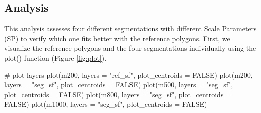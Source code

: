 \subsection{Analysis}

This analysis assesses four different segmentations with different Scale Parameters (SP) to verify which one fits better with the reference polygons. First, we visualize the reference polygons and the four segmentations individually using the plot() function (Figure \ref{fig:plot}). 

\begin{example}
# plot layers
plot(m200, layers = "ref_sf", plot_centroids = FALSE) 
plot(m200, layers = "seg_sf", plot_centroids = FALSE) 
plot(m500, layers = "seg_sf", plot_centroids = FALSE) 
plot(m800, layers = "seg_sf", plot_centroids = FALSE) 
plot(m1000, layers = "seg_sf", plot_centroids = FALSE)
\end{example}

